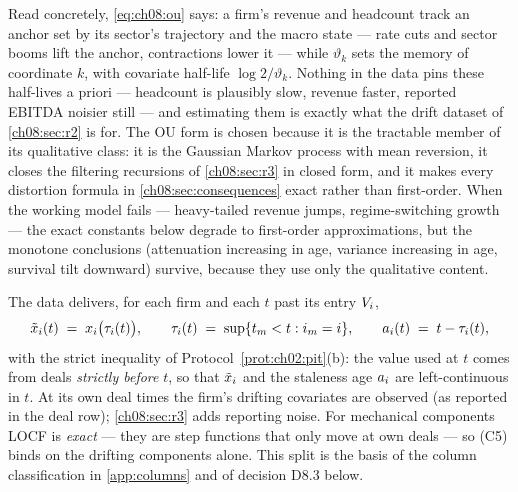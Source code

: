 Read concretely, \cref{eq:ch08:ou} says: a firm's revenue and headcount
track an anchor set by its sector's trajectory and the macro state ---
rate cuts and sector booms lift the anchor, contractions lower it ---
while $\vartheta_k$ sets the memory of coordinate $k$, with covariate
half-life $\log 2 / \vartheta_k$. Nothing in the data pins these
half-lives a priori --- headcount is plausibly slow, revenue faster,
reported EBITDA noisier still --- and estimating them is exactly what the
drift dataset of \cref{ch08:sec:r2} is for. The OU form is chosen
because it is the tractable member of its qualitative class: it is the
Gaussian Markov process with mean reversion, it closes the filtering
recursions of \cref{ch08:sec:r3} in closed form, and it makes every
distortion formula in \cref{ch08:sec:consequences} exact rather than
first-order. When the working model fails --- heavy-tailed revenue jumps,
regime-switching growth --- the exact constants below degrade to
first-order approximations, but the monotone conclusions (attenuation
increasing in age, variance increasing in age, survival tilt downward)
survive, because they use only the qualitative content.

\begin{assumption}\label{asm:ch08:locf}
The data delivers, for each firm and each $t$ past its entry $V_i$,
\begin{equation}\label{eq:ch08:locf}
\tilde{x}_i(t) \;=\; x_i\big(\tau_i(t)\big),
\qquad
\tau_i(t) \;=\; \sup\{t_m < t : i_m = i\},
\qquad
a_i(t) \;=\; t - \tau_i(t),
\end{equation}
with the strict inequality of Protocol~\ref{prot:ch02:pit}(b): the value used at
$t$ comes from deals \emph{strictly before} $t$, so that
$\tilde{x}_i$ and the staleness age $a_i$ are left-continuous
in $t$. At its own deal times the firm's drifting covariates are observed
(as reported in the deal row); \cref{ch08:sec:r3} adds reporting noise.
For mechanical components LOCF is \emph{exact} --- they are step
functions that only move at own deals --- so (C5) binds on the drifting
components alone. This split is the basis of the column classification in
\cref{app:columns} and of decision D8.3 below.
\end{assumption}

